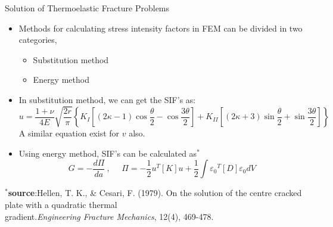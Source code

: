 \documentclass{beamer}
\begin{document}
\begin{frame}[t,fragile]{Solution of Thermoelastic Fracture Problems}
    \vspace{-.4cm}
    \begin{itemize}
        \item Methods for calculating stress intensity factors in FEM can be divided in two categories,
            \begin{itemize}
                \item Substitution method 
                \item Energy method 
            \end{itemize}
        \item In substitution method, we can get the SIF's as:
            \footnotesize
            $$ u=\frac{1+\nu}{4E}\sqrt{\frac{2r}{\pi}}\left\{ K_I\left[ (2\kappa -1)\cos \frac{\theta}{2}-\cos \frac{3\theta}{2} \right]+K_{II}\left[ (2\kappa +3)\sin\frac{\theta}{2}+\sin\frac{3\theta}{2} \right] \right\}$$
            \normalsize
A similar equation exist for $v$ also. 
        \item Using energy method, SIF's can be calculated as$^\ast$ 
            \footnotesize
$$G=-\frac{d\Pi}{da}\ ,\ \ \ \ \ \  
\Pi=-\frac{1}{2}{u}^T[K]{u}+\frac{1}{2}\int{\varepsilon_0}^T[D]{\varepsilon_0}dV$$
 
    \end{itemize}
    \vspace{-.1cm}
   \tiny
   \hspace{15pt}
   $^\ast$\textbf{source}:Hellen, T. K., \& Cesari, F. (1979). On the solution of the centre cracked plate with a quadratic thermal\\ 
   \vspace{-7pt}
   \hspace{15pt}
   gradient.\emph{Engineering Fracture Mechanics}, 12(4), 469-478.
\end{frame} 
\end{document}

